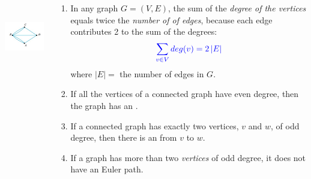 \documentclass[aspectratio=169]{beamer}
\begin{document}
\begin{frame}[plain]{}
 
 
   \begin{columns}[t] %
        \begin{column}[c]{2.5cm}           
          \begin{center}
         \includegraphics[height=3cm]{./img/lecture5-fig3.png}
       \end{center}
        \end{column}
       \begin{column}[c]{8.5cm} %
          \begin{enumerate}[<+->]
           \item In any graph $G = (V,E)$, the sum of the \emph{degree of the vertices} 
             equals twice the \emph{number of of edges}, because each edge 
             contributes 2 to the sum of the degrees:
             \[ \textcolor{blue}{\sum_{v\in V}deg(v) = 2\,|E| }\]
             where $|E| = $ the number of edges in $G$.
           \item If all the vertices of a connected graph have even degree,
              then the graph has an .
           \item If a connected graph has exactly two vertices, $v$ and $w$, of odd degree,
             then there is an  from $v$ to $w$.
           \item If a graph has more than two \emph{vertices} of odd degree, it does not
              have an Euler path.
          \end{enumerate}
           
        \end{column}
  \end{columns}  
     
\end{frame}
\end{document}
